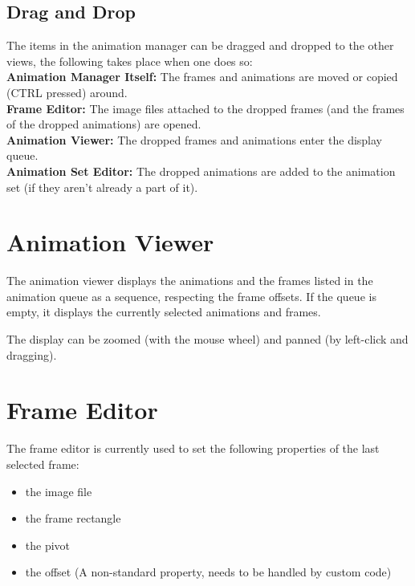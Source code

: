 \documentclass{article}
\begin{document}
\subsection{Drag and Drop}
The items in the animation manager can be dragged and dropped to the other views, the following takes place when one does so:
\\ \textbf{Animation Manager Itself:} The frames and animations are moved or copied (CTRL pressed) around.
\\ \textbf{Frame Editor:} The image files attached to the dropped frames (and the frames of the dropped animations) are opened.
\\ \textbf{Animation Viewer:} The dropped frames and animations enter the display queue.
\\ \textbf{Animation Set Editor:} The dropped animations are added to the animation set (if they aren't already a part of it).


\section{Animation Viewer}
The animation viewer displays the animations and the frames listed in the animation queue as a sequence, respecting the frame offsets. If the queue is empty, it displays the currently selected animations and frames.

The display can be zoomed (with the mouse wheel) and panned (by left-click and dragging).

\section{Frame Editor}
The frame editor is currently used to set the following properties of the last selected frame:
\begin{itemize}
\item the image file
\item the frame rectangle
\item the pivot
\item the offset (A non-standard property, needs to be handled by custom code)
\end{itemize}
\end{document}

